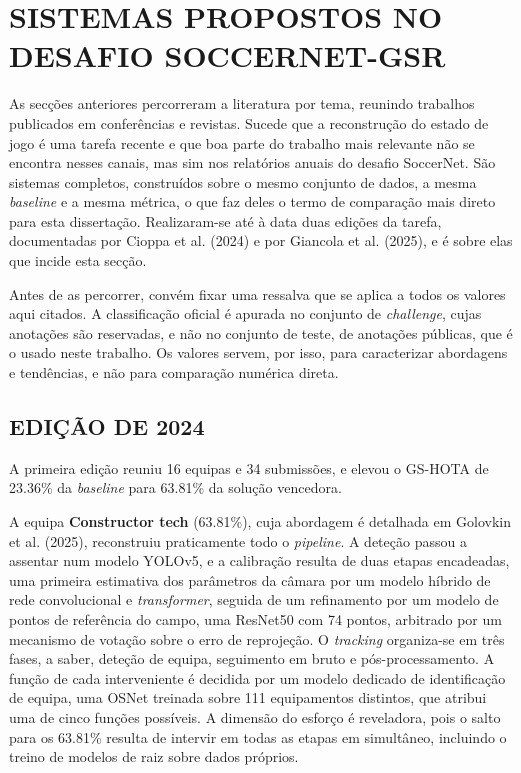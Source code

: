 
\section{SISTEMAS PROPOSTOS NO DESAFIO SOCCERNET-GSR}
\label{sec:sistemas_gsr}

As secções anteriores percorreram a literatura por tema, reunindo trabalhos publicados
em conferências e revistas. Sucede que a reconstrução do estado de jogo é uma tarefa
recente e que boa parte do trabalho mais relevante não se encontra nesses canais, mas
sim nos relatórios anuais do desafio SoccerNet. São sistemas completos, construídos
sobre o mesmo conjunto de dados, a mesma \emph{baseline} e a mesma métrica, o que faz
deles o termo de comparação mais direto para esta dissertação. Realizaram-se até à data
duas edições da tarefa, documentadas por Cioppa et al. (2024) e por Giancola et al.
(2025), e é sobre elas que incide esta secção.

Antes de as percorrer, convém fixar uma ressalva que se aplica a todos os valores aqui
citados. A classificação oficial é apurada no conjunto de \emph{challenge}, cujas
anotações são reservadas, e não no conjunto de teste, de anotações públicas, que é o
usado neste trabalho. Os valores servem, por isso, para caracterizar abordagens e
tendências, e não para comparação numérica direta.

\subsection{EDIÇÃO DE 2024}

A primeira edição reuniu 16 equipas e 34 submissões, e elevou o GS-HOTA de 23.36\% da
\emph{baseline} para 63.81\% da solução vencedora.

A equipa \textbf{Constructor tech} (63.81\%), cuja abordagem é detalhada em Golovkin et al.
(2025), reconstruiu praticamente todo o \emph{pipeline}. A deteção passou a assentar num
modelo YOLOv5, e a calibração resulta de duas etapas encadeadas, uma primeira estimativa
dos parâmetros da câmara por um modelo híbrido de rede convolucional e \emph{transformer},
seguida de um refinamento por um modelo de pontos de referência do campo, uma ResNet50 com
74 pontos, arbitrado por um mecanismo de votação sobre o erro de reprojeção. O
\emph{tracking} organiza-se em três fases, a saber, deteção de equipa, seguimento em bruto
e pós-processamento. A função de cada interveniente é decidida por um modelo dedicado de
identificação de equipa, uma OSNet treinada sobre 111 equipamentos distintos, que atribui
uma de cinco funções possíveis. A dimensão do esforço é reveladora, pois o salto para os
63.81\% resulta de intervir em todas as etapas em simultâneo, incluindo o treino de modelos
de raiz sobre dados próprios.

